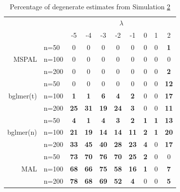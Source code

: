 \documentclass[11pt, a4paper]{article}
\newcommand*{\bb}{\boldsymbol}
\theoremstyle{example} \newtheorem{example}{Example}[section]
\theoremstyle{theorem} \newtheorem{theorem}{Theorem}[section]
\theoremstyle{theorem }\newtheorem{proposition}{Proposition}[section]
\theoremstyle{theorem }\newtheorem{corollary}{Corollary}[section]
\def\\bbeta{\bb{\\bbeta}}
\begin{document}
\begin{table}[H]
	\centering
	\caption{Percentage of degenerate estimates from Simulation \hyperref[sec:sim2]{2}} 
	\label{tab:sim2}
		\begin{tabular}{rlcccccccc}
			\toprule
			&&\multicolumn{8}{c}{$\lambda$} \\ \cmidrule{3-10}
			&  & -5 & -4 & -3 & -2 & -1 & 0 & 1 & 2 \\ 
			\cmidrule{3-10}
			& n=50 & 0 & 0 & 0 & 0 & 0 & 0 & 0 & \textbf{1} \\ 
			MSPAL & n=100 & 0 & 0 & 0 & 0 & 0 & 0 & 0 & 0 \\ 
			& n=200 & 0 & 0 & 0 & 0 & 0 & 0 & 0 & \textbf{2} \\ \cmidrule{3-10}
			& n=50 & 0 & 0 & 0 & 0 & 0 & 0 & 0 & \textbf{12} \\ 
			bglmer(t) & n=100 & \textbf{1} & \textbf{1} & \textbf{6} & \textbf{4} & \textbf{2} & 0 & 0 & \textbf{17} \\ 
			& n=200 & \textbf{25} & \textbf{31} & \textbf{19} & \textbf{24} & \textbf{3} & 0 & 0 & \textbf{11} \\ \cmidrule{3-10}
			& n=50 & \textbf{4} & \textbf{1} & \textbf{4} & \textbf{3} & \textbf{2} & \textbf{1} & \textbf{1} & \textbf{13} \\ 
			bglmer(n) & n=100 & \textbf{21} & \textbf{19} & \textbf{14} & \textbf{14} & \textbf{11} & \textbf{2} & \textbf{1} & \textbf{20} \\ 
			& n=200 & \textbf{33} & \textbf{45} & \textbf{40} & \textbf{28} & \textbf{23} & \textbf{4} & 0 & \textbf{17} \\ \cmidrule{3-10}
			& n=50 & \textbf{73} & \textbf{70} & \textbf{76} & \textbf{70} & \textbf{25} & \textbf{2} & 0 & 0 \\ 
			MAL & n=100 & \textbf{68} & \textbf{66} & \textbf{75} & \textbf{58} & \textbf{16} & \textbf{1} & 0 & \textbf{7} \\ 
			& n=200 & \textbf{78} & \textbf{68} & \textbf{69} & \textbf{52} & \textbf{4} & 0 & 0 & \textbf{5} \\ 
			\bottomrule
		\end{tabular}
\end{table}
\end{document}
